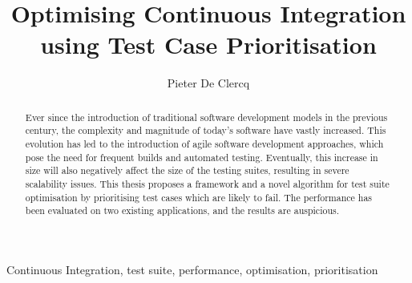 \documentclass[10pt,twocolumn,twoside]{phdsymp-en}
\begin{document}
	\title{Optimising Continuous Integration\\ using Test Case Prioritisation}
	\author{Pieter De Clercq}
	\maketitle
	
	\begin{abstract}
	Ever since the introduction of traditional software development models in the previous century, the complexity and magnitude of today's software have vastly increased. This evolution has led to the introduction of agile software development approaches, which pose the need for frequent builds and automated testing. Eventually, this increase in size will also negatively affect the size of the testing suites, resulting in severe scalability issues. This thesis proposes a framework and a novel algorithm for test suite optimisation by prioritising test cases which are likely to fail. The performance has been evaluated on two existing applications, and the results are auspicious.
	\end{abstract}

	\begin{keywords}
		Continuous Integration, test suite, performance, optimisation, prioritisation
	\end{keywords}

	
	
	
	
	
	
	
	
	
\end{document}
